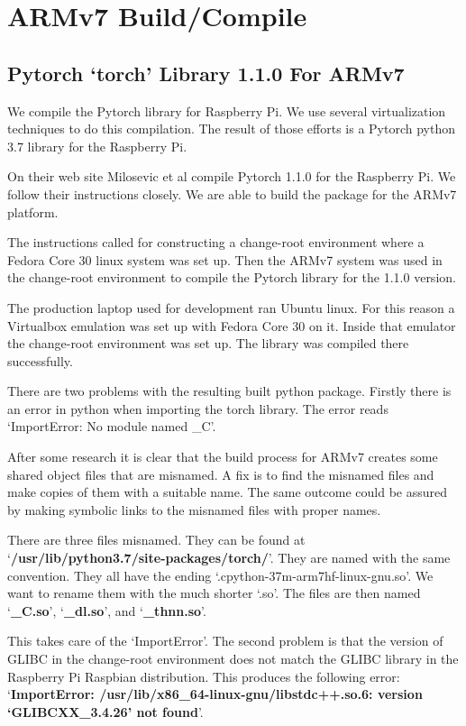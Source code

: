 \section{ARMv7 Build/Compile}

\subsection{Pytorch `torch' Library 1.1.0 For ARMv7}
We compile the Pytorch library for Raspberry Pi. We use several virtualization techniques to do this compilation. The result of those efforts is a Pytorch python 3.7 library for the Raspberry Pi.

On their web site Milosevic et al\cite{2018Milosevic} compile Pytorch 1.1.0 for the Raspberry Pi. We follow their instructions closely. We are able to build the package for the ARMv7 platform.

The instructions called for constructing a change-root environment where a Fedora Core 30 linux system was set up. Then the ARMv7 system was used in the change-root environment to compile the Pytorch library for the 1.1.0 version.

The production laptop used for development ran Ubuntu linux. For this reason a Virtualbox emulation was set up with Fedora Core 30 on it. Inside that emulator the change-root environment was set up. The library was compiled there successfully. 

There are two problems with the resulting built python package. Firstly there is an error in python when importing the torch library. The error reads `ImportError: No module named \_C'. 

After some research it is clear that the build process for ARMv7 creates some shared object files that are misnamed. A fix is to find the misnamed files and make copies of them with a suitable name. The same outcome could be assured by making symbolic links to the misnamed files with proper names.

There are three files misnamed. They can be found at `\textbf{/usr/lib/python3.7/site-packages/torch/}'. They are named with the same convention. They all have the ending `.cpython-37m-arm7hf-linux-gnu.so'. We want to rename them with the much shorter `.so'. The files are then named `\textbf{\_C.so}', `\textbf{\_dl.so}', and `\textbf{\_thnn.so}'.

This takes care of the `ImportError'. The second problem is that the version of GLIBC in the change-root environment does not match the GLIBC library in the Raspberry Pi Raspbian distribution. This produces the following error: `\textbf{ImportError: /usr/lib/x86\_64-linux-gnu/libstdc++.so.6: version `GLIBCXX\_3.4.26' not found}'.

